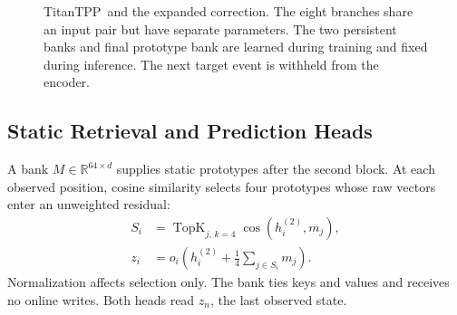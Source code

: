 \documentclass[runningheads]{llncs}
\providecommand{\Description}[1]{}
\newcommand{\method}{TitanTPP}
\begin{document}
\begin{figure}[t]
\Description{The left pipeline passes observed gaps and quantities through
two causal encoders with a history correction between them, then static
prototype retrieval and two prediction heads. The expanded module on the
right sends the same current and predecessor state pair through eight
independent bottleneck branches, applies availability masks, sums and divides
by eight, and adds the result to the current state.}
\caption{\method\ and the expanded correction. The eight branches share an
input pair but have separate parameters. The two persistent banks and final
prototype bank are learned during training and fixed during inference. The
next target event is withheld from the encoder.}
\label{fig:architecture}
\end{figure}

\subsection{Static Retrieval and Prediction Heads}
A bank $M\in\mathbb R^{64\times d}$ supplies static prototypes after the
second block. At each observed position, cosine similarity selects four
prototypes whose raw vectors enter an unweighted residual:
\begin{equation}
 \begin{aligned}
 S_i&=\operatorname{TopK}_{j,\,k=4}\operatorname{cos}(h_i^{(2)},m_j),\\
 z_i&=o_i\left(h_i^{(2)}+\frac14\sum_{j\in S_i}m_j\right).
 \end{aligned}
 \label{eq:retrieval}
\end{equation}
Normalization affects selection only. The bank ties keys and values and
receives no online writes. Both heads read $z_n$, the last observed state.
\end{document}
